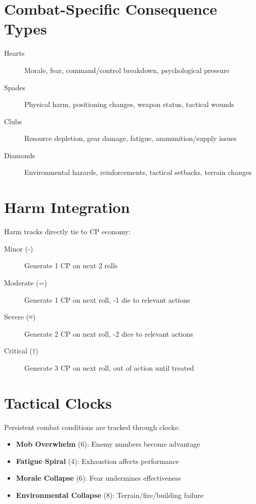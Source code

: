 \section{Combat-Specific Consequence Types}
\begin{description}
\item[Hearts] Morale, fear, command/control breakdown, psychological pressure
\item[Spades] Physical harm, positioning changes, weapon status, tactical wounds
\item[Clubs] Resource depletion, gear damage, fatigue, ammunition/supply issues
\item[Diamonds] Environmental hazards, reinforcements, tactical setbacks, terrain changes
\end{description}

\section{Harm Integration}
Harm tracks directly tie to CP economy:
\begin{description}
\item[Minor (-)] Generate 1 CP on next 2 rolls
\item[Moderate (=)] Generate 1 CP on next roll, -1 die to relevant actions
\item[Severe (≈)] Generate 2 CP on next roll, -2 dice to relevant actions  
\item[Critical (†)] Generate 3 CP on next roll, out of action until treated
\end{description}

\section{Tactical Clocks}
Persistent combat conditions are tracked through clocks:
\begin{itemize}
    \item \textbf{Mob Overwhelm} (6): Enemy numbers become advantage
    \item \textbf{Fatigue Spiral} (4): Exhaustion affects performance
    \item \textbf{Morale Collapse} (6): Fear undermines effectiveness
    \item \textbf{Environmental Collapse} (8): Terrain/fire/building failure
\end{itemize}

